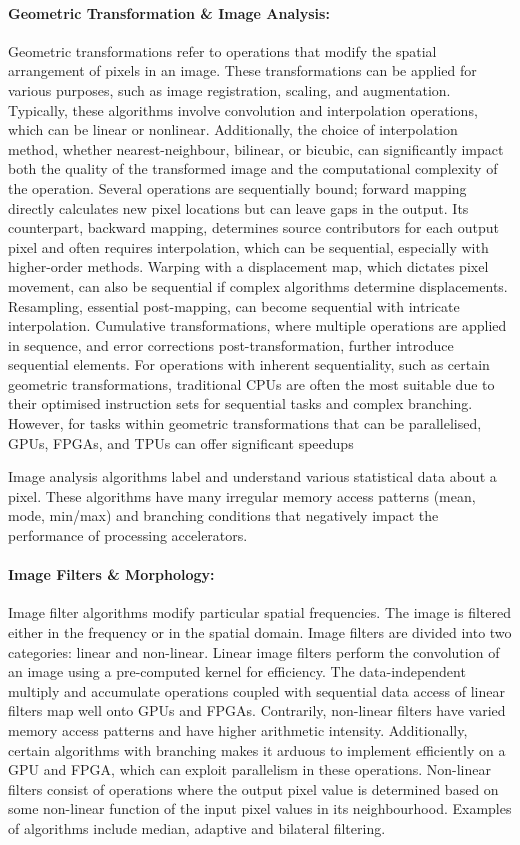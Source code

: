\paragraph{Geometric Transformation \& Image Analysis:} 
Geometric transformations refer to operations that modify the spatial arrangement of pixels in an image. These transformations can be applied for various purposes, such as image registration, scaling, and augmentation. Typically, these algorithms involve convolution and interpolation operations, which can be linear or nonlinear. Additionally, the choice of interpolation method, whether nearest-neighbour, bilinear, or bicubic, can significantly impact both the quality of the transformed image and the computational complexity of the operation. Several operations are sequentially bound; forward mapping directly calculates new pixel locations but can leave gaps in the output. Its counterpart, backward mapping, determines source contributors for each output pixel and often requires interpolation, which can be sequential, especially with higher-order methods. Warping with a displacement map, which dictates pixel movement, can also be sequential if complex algorithms determine displacements. Resampling, essential post-mapping, can become sequential with intricate interpolation. Cumulative transformations, where multiple operations are applied in sequence, and error corrections post-transformation, further introduce sequential elements. For operations with inherent sequentiality, such as certain geometric transformations, traditional CPUs are often the most suitable due to their optimised instruction sets for sequential tasks and complex branching. However, for tasks within geometric transformations that can be parallelised, GPUs, FPGAs, and TPUs can offer significant speedups

Image analysis algorithms label and understand various statistical data about a pixel. These algorithms have many irregular memory access patterns (mean, mode, min/max) and branching conditions that negatively impact the performance of processing accelerators. 


\paragraph{Image Filters \& Morphology:} Image filter algorithms modify particular spatial frequencies. The image is filtered either in the frequency or in the spatial domain. Image filters are divided into two categories: linear and non-linear. Linear image filters perform the convolution of an image using a pre-computed kernel for efficiency. The data-independent multiply and accumulate operations coupled with sequential data access of linear filters map well onto GPUs and FPGAs. Contrarily, non-linear filters have varied memory access patterns and have higher arithmetic intensity. Additionally, certain algorithms with branching makes it arduous to implement efficiently on a GPU and FPGA, which can exploit parallelism in these operations. Non-linear filters consist of operations where the output pixel value is determined based on some non-linear function of the input pixel values in its neighbourhood. Examples of algorithms include median, adaptive and bilateral filtering.


